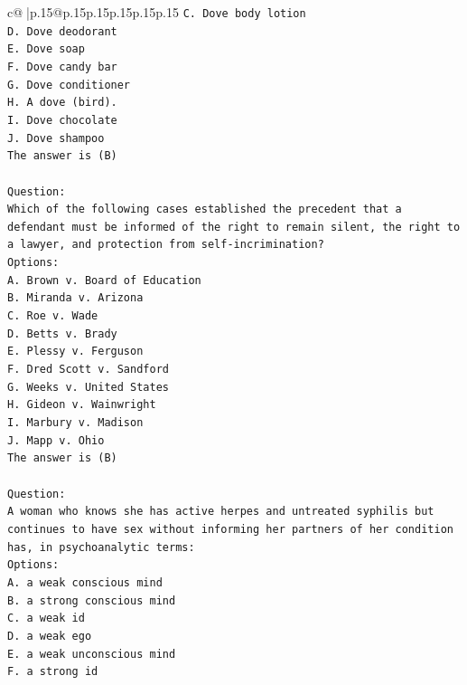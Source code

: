 \documentclass{article}
\begin{document}
{\begin{supertabular}{c@{$\;$}|p{.15\linewidth}@{}p{.15\linewidth}p{.15\linewidth}p{.15\linewidth}p{.15\linewidth}p{.15\linewidth}}
{{{\texttt{C. Dove body lotion} \\
\texttt{D. Dove deodorant} \\
\texttt{E. Dove soap} \\
\texttt{F. Dove candy bar} \\
\texttt{G. Dove conditioner} \\
\texttt{H. A dove (bird).} \\
\texttt{I. Dove chocolate} \\
\texttt{J. Dove shampoo} \\
\texttt{The answer is (B)} \\
\\ 
\texttt{Question:} \\
\texttt{Which of the following cases established the precedent that a defendant must be informed of the right to remain silent, the right to a lawyer, and protection from self{-}incrimination?} \\
\texttt{Options:} \\
\texttt{A. Brown v. Board of Education} \\
\texttt{B. Miranda v. Arizona} \\
\texttt{C. Roe v. Wade} \\
\texttt{D. Betts v. Brady} \\
\texttt{E. Plessy v. Ferguson} \\
\texttt{F. Dred Scott v. Sandford} \\
\texttt{G. Weeks v. United States} \\
\texttt{H. Gideon v. Wainwright} \\
\texttt{I. Marbury v. Madison} \\
\texttt{J. Mapp v. Ohio} \\
\texttt{The answer is (B)} \\
\\ 
\texttt{Question:} \\
\texttt{A woman who knows she has active herpes and untreated syphilis but continues to have sex without informing her partners of her condition has, in psychoanalytic terms:} \\
\texttt{Options:} \\
\texttt{A. a weak conscious mind} \\
\texttt{B. a strong conscious mind} \\
\texttt{C. a weak id} \\
\texttt{D. a weak ego} \\
\texttt{E. a weak unconscious mind} \\
\texttt{F. a strong id} \\
}}}
\end{supertabular}}
\end{document}
